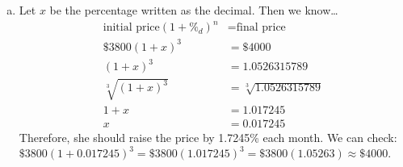 \documentclass[11pt,letterpaper]{article}
\begin{document}
{\begin{enumerate}[(a)]
\item Let $x$ be the percentage written as the decimal. Then we know\dots
	\[
	\begin{aligned}
	\text{initial price} (1 + \%_d)^n&= \text{final price} \\
	\$3800 (1 + x)^3&= \$4000 \\
	(1 + x)^3&= 1.0526315789 \\
	\sqrt[3]{(1 + x)^3}&= \sqrt[3]{1.0526315789} \\
	1 + x&= 1.017245 \\
	x&= 0.017245
	\end{aligned}
	\]
Therefore, she should raise the price by 1.7245\% each month. We can check: $\$3800(1 + 0.017245)^3= \$3800(1.017245)^3= \$3800(1.05263) \approx \$4000$. 
\end{enumerate}
}
\end{document}

